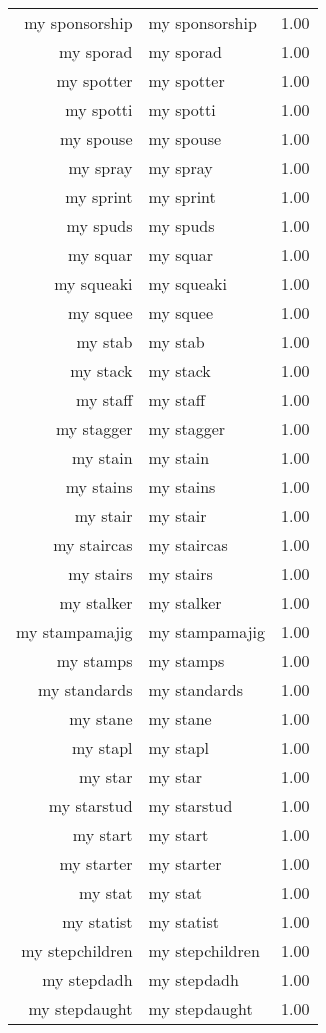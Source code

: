 \begin{table}[ht]
\begin{tabular}{rlr}
  my sponsorship & my sponsorship & 1.00 \\ 
  my sporad & my sporad & 1.00 \\ 
  my spotter & my spotter & 1.00 \\ 
  my spotti & my spotti & 1.00 \\ 
  my spouse & my spouse & 1.00 \\ 
  my spray & my spray & 1.00 \\ 
  my sprint & my sprint & 1.00 \\ 
  my spuds & my spuds & 1.00 \\ 
  my squar & my squar & 1.00 \\ 
  my squeaki & my squeaki & 1.00 \\ 
  my squee & my squee & 1.00 \\ 
  my stab & my stab & 1.00 \\ 
  my stack & my stack & 1.00 \\ 
  my staff & my staff & 1.00 \\ 
  my stagger & my stagger & 1.00 \\ 
  my stain & my stain & 1.00 \\ 
  my stains & my stains & 1.00 \\ 
  my stair & my stair & 1.00 \\ 
  my staircas & my staircas & 1.00 \\ 
  my stairs & my stairs & 1.00 \\ 
  my stalker & my stalker & 1.00 \\ 
  my stampamajig & my stampamajig & 1.00 \\ 
  my stamps & my stamps & 1.00 \\ 
  my standards & my standards & 1.00 \\ 
  my stane & my stane & 1.00 \\ 
  my stapl & my stapl & 1.00 \\ 
  my star & my star & 1.00 \\ 
  my starstud & my starstud & 1.00 \\ 
  my start & my start & 1.00 \\ 
  my starter & my starter & 1.00 \\ 
  my stat & my stat & 1.00 \\ 
  my statist & my statist & 1.00 \\ 
  my stepchildren & my stepchildren & 1.00 \\ 
  my stepdadh & my stepdadh & 1.00 \\ 
  my stepdaught & my stepdaught & 1.00 \\ 

\end{tabular}
\end{table}
